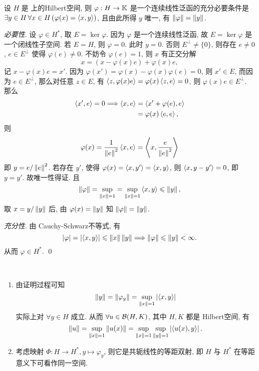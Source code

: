 	\begin{Theorem}[Riesz表示定理]
		 设 $ H $ 是 \K 上的Hilbert空间, 则 $ \varphi: H\to \mathbb{K} $ 是一个连续线性泛函的充分必要条件是 $ \exists y\in H\,\forall x\in H\,(\varphi(x)=\left\langle x, y \right\rangle) $, 且由此所得 $ y $ 唯一, 有 $ \left\| \varphi \right\|=\left\| y \right\| $.
	\end{Theorem}

	\begin{Proof}
		\textsl{必要性}. 设 $ \varphi\in H^{*} $, 取 $ E=\ker\varphi $. 因为 $ \varphi $ 是一个连续线性泛函, 故 $ E=\ker\varphi $ 是一个闭线性子空间. 若 $ E=H $, 则 $ \varphi=0 $. 此时 $ y=0 $. 否则 $ E^{\bot}\ne\{0\} $, 则存在 $ e\ne0 $, $ e\in E^{\bot} $ 使得 $ \varphi(e)\ne0 $. 不妨令 $ \varphi(e)=1 $, 则 $ x $ 有正交分解
		\[
			x=(x-\varphi(x)e)+\varphi(x)e,
		\]
		记 $ x-\varphi(x)e=x' $. 因为 $ \varphi(x')=\varphi(x)-\varphi(x)\varphi(e)=0 $, 则 $ x'\in E $, 而因为 $ e\in E^{\bot} $, 那么对任意 $ z\in E $, 有 $ \left\langle z, \varphi(x)e \right\rangle=\varphi(x)\left\langle z, e \right\rangle=0 $, 则 $ \varphi(x)e\in E^{\bot} $. 那么
		\[
			\begin{aligned}
				\left\langle x', e \right\rangle=0\Longrightarrow \left\langle x, e \right\rangle & =\left\langle x'+\varphi(e), e \right\rangle\\
				& =\varphi(x)\left\langle e, e \right\rangle,
			\end{aligned}
		\]
		则
		\[
			\varphi(x)=\frac{1}{\left\| e \right\|^{2}}\left\langle x, e \right\rangle=\left\langle x, \frac{e}{\left\| e \right\|^{2}} \right\rangle
		\]
		即 $ y=e/\left\| e \right\|^{2} $. 若存在 $ y' $, 使得 $ \varphi(x)=\left\langle x, y' \right\rangle=\left\langle x, y \right\rangle $, 则 $ \left\langle x, y-y' \right\rangle=0 $, 即 $ y=y' $. 故唯一性得证. 且
		\[
			\left\| \varphi \right\|=\sup_{\left\| x \right\|=1}=\sup_{\left\| x \right\|=1}\left\langle x, y \right\rangle\leqslant\left\| y \right\|,
		\]
		取 $ x=y/\left\| y \right\| $ 后, 由 $ \varphi(x)=\left\| y \right\| $ 知 $ \left\| \varphi \right\|=\left\| y \right\| $.

		\textsl{充分性}. 由 Cauchy-Schwarz不等式, 有
		\[
			\left| \varphi \right| =\left| \left\langle x, y \right\rangle \right| \leqslant\left\| x \right\|\left\| y \right\| \Longrightarrow \left\| \varphi \right\|\leqslant\left\| y \right\|<\infty.
		\]
		从而 $  \varphi\in H^{*} $. \qed
	\end{Proof}

	\begin{Remark}~
		\begin{enumerate}[(1)]
			\item 由证明过程可知
			\[
				\left\| y \right\|=\left\| \varphi_{y} \right\|=\sup_{\left\| x \right\|=1}\left| \left\langle x, y \right\rangle \right| 
			\]
			实际上对 $ \forall y\in H $ 成立. 从而 $ \forall u\in \mathcal{B}(H, K) $, 其中 $ H, K $ 都是 Hilbert空间, 有
			\[
				\left\| u \right\|=\sup_{\left\| x \right\|=1}\left\| u(x) \right\|=\sup_{\left\| x \right\|=1}\sup_{\left\| y \right\|=1}\left| \left\langle u(x), y \right\rangle \right| .
			\]
			\item 考虑映射 $ \varPhi: H\to H^{*}, y\mapsto \varphi_{y} $, 则它是共轭线性的等距双射, 即 $ H $ 与 $ H^{*} $ 在等距意义下可看作同一空间.
		\end{enumerate}
	\end{Remark}

